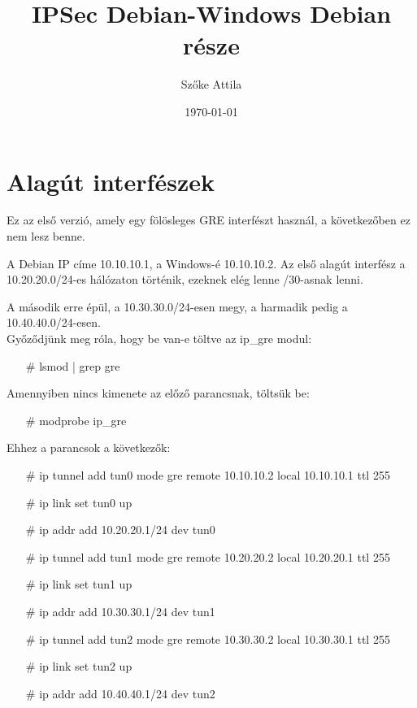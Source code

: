 \documentclass{article} %
\title{IPSec Debian-Windows Debian része} %
\author{Szőke Attila} %
\date{\today} %
\begin{document}
    \maketitle %


\vspace{5mm}
    \section*{Alagút interfészek} %

    Ez az első verzió, amely egy fölösleges GRE interfészt használ, a következőben ez nem lesz benne.
    
    A Debian IP címe 10.10.10.1, a Windows-é 10.10.10.2. Az első alagút interfész a 10.20.20.0/24-es hálózaton történik, ezeknek elég lenne /30-asnak lenni.
    
    A második erre épül, a 10.30.30.0/24-esen megy, a harmadik pedig a 10.40.40.0/24-esen. \\

    Győződjünk meg róla, hogy be van-e töltve az ip\_gre modul:

    \begin{itemize}
	    \item[\#] lsmod | grep gre
    \end{itemize}

    Amennyiben nincs kimenete az előző parancsnak, töltsük be:

    \begin{itemize}
	    \item[\#] modprobe ip\_gre
    \end{itemize}

    Ehhez a parancsok a következők:
    \begin{itemize}
	    \item[\#] ip tunnel add tun0 mode gre remote 10.10.10.2 local 10.10.10.1 ttl 255
	    \item[\#] ip link set tun0 up
	    \item[\#] ip addr add 10.20.20.1/24 dev tun0
	    \item[\#] ip tunnel add tun1 mode gre remote 10.20.20.2 local 10.20.20.1 ttl 255
	    \item[\#] ip link set tun1 up
	    \item[\#] ip addr add 10.30.30.1/24 dev tun1
	    \item[\#] ip tunnel add tun2 mode gre remote 10.30.30.2 local 10.30.30.1 ttl 255
	    \item[\#] ip link set tun2 up
	    \item[\#] ip addr add 10.40.40.1/24 dev tun2
     \end{itemize}
\end{document}
